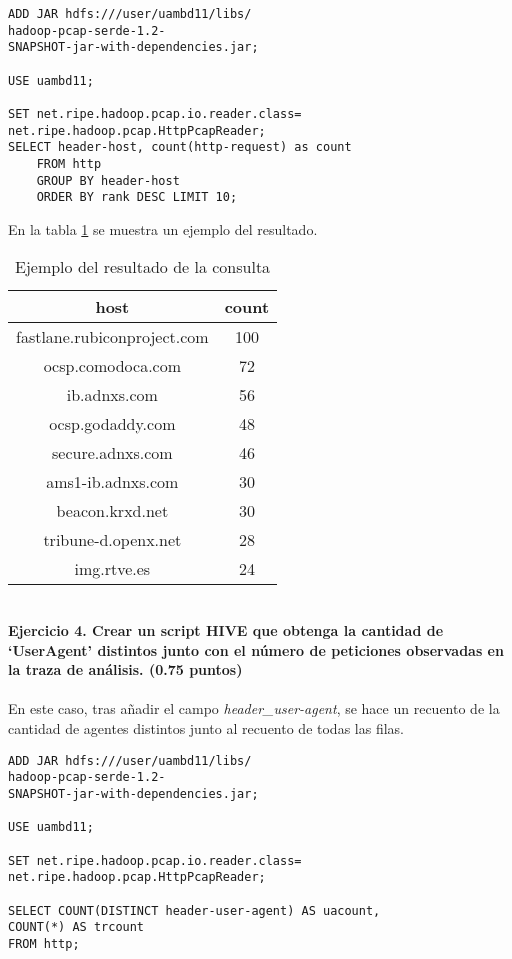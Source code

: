 \begin{lstlisting}[caption=Consulta para obtener el ranking de hosts]
ADD JAR hdfs:///user/uambd11/libs/
hadoop-pcap-serde-1.2-
SNAPSHOT-jar-with-dependencies.jar;

USE uambd11;

SET net.ripe.hadoop.pcap.io.reader.class=
net.ripe.hadoop.pcap.HttpPcapReader;
SELECT header-host, count(http-request) as count
	FROM http 
	GROUP BY header-host 
	ORDER BY rank DESC LIMIT 10;
\end{lstlisting}
En la tabla \ref{tab:c3} se muestra un ejemplo del resultado.
\begin{table}[ht]
	\centering
	\caption{Ejemplo del resultado de la consulta}
	\begin{tabular}[t]{cc}
		host & count \\
		\hline
		fastlane.rubiconproject.com	& 100 \\
		ocsp.comodoca.com &	72\\
		ib.adnxs.com &	56\\
		ocsp.godaddy.com &	48\\
		secure.adnxs.com &	46\\
		ams1-ib.adnxs.com &	30\\
		beacon.krxd.net &	30\\
		tribune-d.openx.net &	28\\
		img.rtve.es	& 24 
	\end{tabular}
	\label{tab:c3}
\end{table}%
\\
\textbf{Ejercicio 4. Crear un script HIVE que obtenga la cantidad de ‘UserAgent’ distintos junto con el número de
	peticiones observadas en la traza de análisis. (0.75 puntos)}\\\\
En este caso, tras añadir el campo \textit{header\_user-agent}, se hace un recuento de la cantidad de agentes distintos junto al recuento de todas las filas.
\begin{lstlisting}[caption=Consulta para obtener el resúmen de agentes.]
ADD JAR hdfs:///user/uambd11/libs/
hadoop-pcap-serde-1.2-
SNAPSHOT-jar-with-dependencies.jar;

USE uambd11;

SET net.ripe.hadoop.pcap.io.reader.class=
net.ripe.hadoop.pcap.HttpPcapReader;

SELECT COUNT(DISTINCT header-user-agent) AS uacount,
COUNT(*) AS trcount 
FROM http;
\end{lstlisting}
